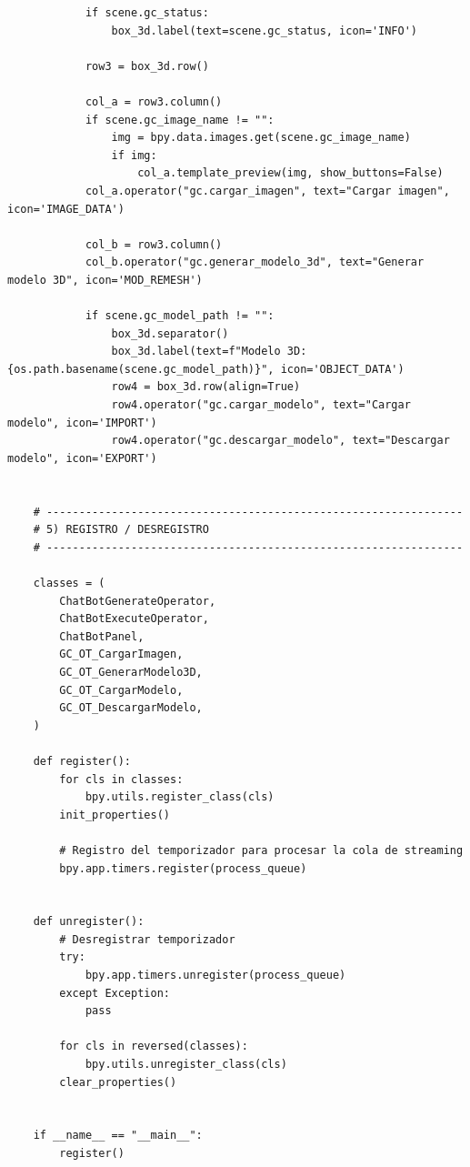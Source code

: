 \begin{verbatim}
            if scene.gc_status:
                box_3d.label(text=scene.gc_status, icon='INFO')
    
            row3 = box_3d.row()
    
            col_a = row3.column()
            if scene.gc_image_name != "":
                img = bpy.data.images.get(scene.gc_image_name)
                if img:
                    col_a.template_preview(img, show_buttons=False)
            col_a.operator("gc.cargar_imagen", text="Cargar imagen", icon='IMAGE_DATA')
    
            col_b = row3.column()
            col_b.operator("gc.generar_modelo_3d", text="Generar modelo 3D", icon='MOD_REMESH')
    
            if scene.gc_model_path != "":
                box_3d.separator()
                box_3d.label(text=f"Modelo 3D: {os.path.basename(scene.gc_model_path)}", icon='OBJECT_DATA')
                row4 = box_3d.row(align=True)
                row4.operator("gc.cargar_modelo", text="Cargar modelo", icon='IMPORT')
                row4.operator("gc.descargar_modelo", text="Descargar modelo", icon='EXPORT')
    
    
    # ----------------------------------------------------------------
    # 5) REGISTRO / DESREGISTRO
    # ----------------------------------------------------------------
    
    classes = (
        ChatBotGenerateOperator,
        ChatBotExecuteOperator,
        ChatBotPanel,
        GC_OT_CargarImagen,
        GC_OT_GenerarModelo3D,
        GC_OT_CargarModelo,
        GC_OT_DescargarModelo,
    )
    
    def register():
        for cls in classes:
            bpy.utils.register_class(cls)
        init_properties()
    
        # Registro del temporizador para procesar la cola de streaming
        bpy.app.timers.register(process_queue)
    
    
    def unregister():
        # Desregistrar temporizador
        try:
            bpy.app.timers.unregister(process_queue)
        except Exception:
            pass
    
        for cls in reversed(classes):
            bpy.utils.unregister_class(cls)
        clear_properties()
    
    
    if __name__ == "__main__":
        register()
\end{verbatim}


